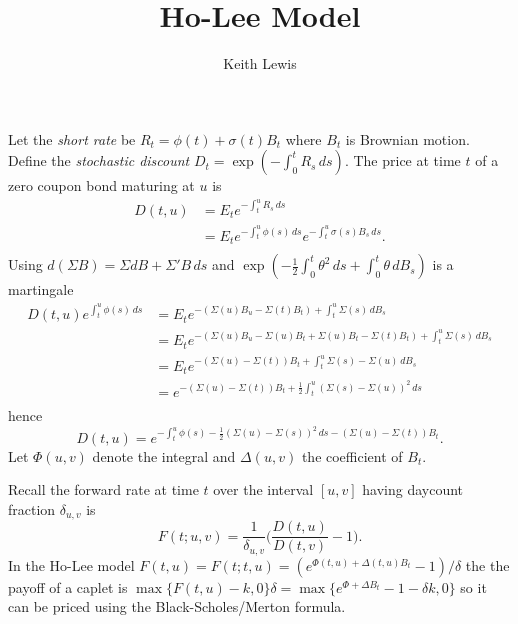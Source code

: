 \documentclass[10pt,letterpaper,fleqn]{report}
\author{Keith Lewis}
\title{Ho-Lee Model}
\begin{document}
\maketitle
Let the {\em short rate} be \(R_t = \phi(t) + \sigma(t)B_t\) where
\(B_t\) is Brownian motion. Define the {\em stochastic discount}
\(D_t = \exp(-\int_0^t R_s\,ds)\). The price at time \(t\) of a {zero
coupon bond} maturing at \(u\) is
\begin{align*}
D(t,u) &= E_t e^{-\int_t^u R_s\,ds}\\
	&= E_t e^{-\int_t^u \phi(s)\,ds}e^{-\int_t^u \sigma(s)B_s\,ds}.\\
\end{align*}
Using \(d(\Sigma B) = \Sigma dB + \Sigma' B\,ds\)  and
\(\exp(-\frac{1}{2}\int_0^t \theta^2\,ds + \int_0^t \theta\,dB_s)\) is
a martingale
\begin{align*}
D(t,u) e^{\int_t^u \phi(s)\,ds}
&= E_t e^{-(\Sigma(u)B_u - \Sigma(t)B_t) + \int_t^u \Sigma(s)\,dB_s}\\
&= E_t e^{-(\Sigma(u)B_u -\Sigma(u)B_t + \Sigma(u)B_t - \Sigma(t)B_t) + \int_t^u \Sigma(s)\,dB_s}\\
&= E_t e^{-(\Sigma(u) - \Sigma(t))B_t + \int_t^u \Sigma(s) - \Sigma(u)\,dB_s}\\
&= e^{-(\Sigma(u) - \Sigma(t))B_t + \frac{1}{2}\int_t^u (\Sigma(s) - \Sigma(u))^2\,ds}\\
\end{align*}
hence
\[
D(t,u) = e^{-\int_t^u \phi(s) 
- \frac{1}{2}(\Sigma(u) - \Sigma(s))^2\,ds
- (\Sigma(u) - \Sigma(t))B_t}.
\]
Let \(\Phi(u,v)\) denote the integral and
\(\Delta(u,v)\) the coefficient of \(B_t\).

Recall the forward rate at time \(t\) over the interval \([u,v]\) having
daycount fraction \(\delta_{u,v}\) is
\[
F(t;u,v) = \frac{1}{\delta_{u,v}}\bigl(\frac{D(t,u)}{D(t,v)} - 1\bigr).
\]
In the Ho-Lee model \(F(t,u) = F(t;t,u) = (e^{\Phi(t,u) + \Delta(t,u)B_t} - 1)/\delta\)
the the payoff of a caplet is \(\max\{F(t,u)-k,0\}\delta = 
\max\{e^{\Phi + \Delta B_t} - 1 - \delta k, 0\}\) so it can be priced using
the Black-Scholes/Merton formula.
\end{document}
